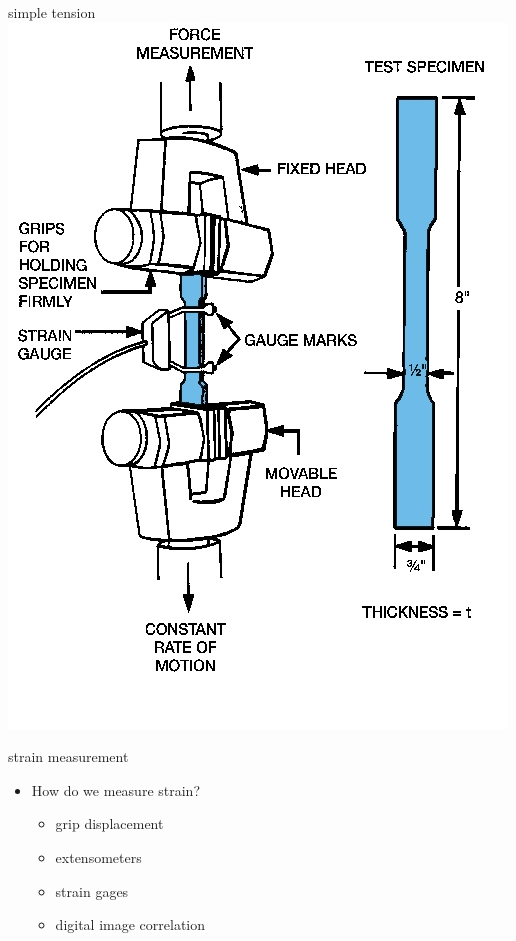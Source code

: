 \documentclass[
  letterpaper,
  ignorenonframetext,
  aspectratio=43,
  handout,
  12pt]{beamer}
\providecommand{\tightlist}{%
  \setlength{\itemsep}{0pt}\setlength{\parskip}{0pt}}
\providecommand{\tightlist}{%
\setlength{\itemsep}{0pt}\setlength{\parskip}{0pt}}
\let\Oldincludegraphics\includegraphics
\renewcommand{\includegraphics}[2][]{\Oldincludegraphics[width=\textwidth,height=0.7\textheight,keepaspectratio]{#2}}
\begin{document}
\begin{frame}{simple tension}
\protect\hypertarget{simple-tension}{}
\includegraphics{../images/uniaxial_tension.jpg}
\end{frame}

\begin{frame}{strain measurement}
\protect\hypertarget{strain-measurement}{}
\begin{itemize}
\tightlist
\item
  How do we measure strain?

  \begin{itemize}
  \tightlist
  \item
    grip displacement
  \item
    extensometers
  \item
    strain gages
  \item
    digital image correlation
  \end{itemize}
\end{itemize}
\end{frame}
\end{document}
